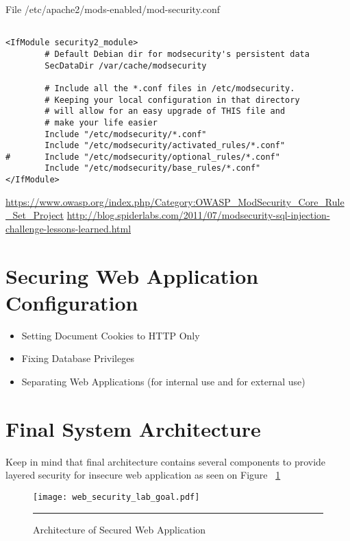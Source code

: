 File /etc/apache2/mods-enabled/mod-security.conf
\begin{verbatim}

<IfModule security2_module>
        # Default Debian dir for modsecurity's persistent data
        SecDataDir /var/cache/modsecurity
 
        # Include all the *.conf files in /etc/modsecurity.
        # Keeping your local configuration in that directory
        # will allow for an easy upgrade of THIS file and
        # make your life easier
        Include "/etc/modsecurity/*.conf"
        Include "/etc/modsecurity/activated_rules/*.conf"
#       Include "/etc/modsecurity/optional_rules/*.conf"
        Include "/etc/modsecurity/base_rules/*.conf"
</IfModule>
\end{verbatim} 

\url{https://www.owasp.org/index.php/Category:OWASP_ModSecurity_Core_Rule_Set_Project}
\url{http://blog.spiderlabs.com/2011/07/modsecurity-sql-injection-challenge-lessons-learned.html}




\section{Securing Web Application Configuration}
\begin{itemize}
\item Setting Document Cookies to HTTP Only
\item Fixing Database Privileges
\item Separating Web Applications (for internal use and for external use)
\end{itemize}

\section{Final System Architecture} 
Keep in mind that final architecture contains several components to provide layered security for insecure web application as seen on Figure ~\ref{Architecture of Secured Web Application}

\begin{figure}[H] 
 \centering 
 \texttt{[image: web\_security\_lab\_goal.pdf]}
 \rule{35em}{0.5pt} 
 \caption{Architecture of Secured Web Application} 
 \label{Architecture of Secured Web Application} 
\end{figure}


